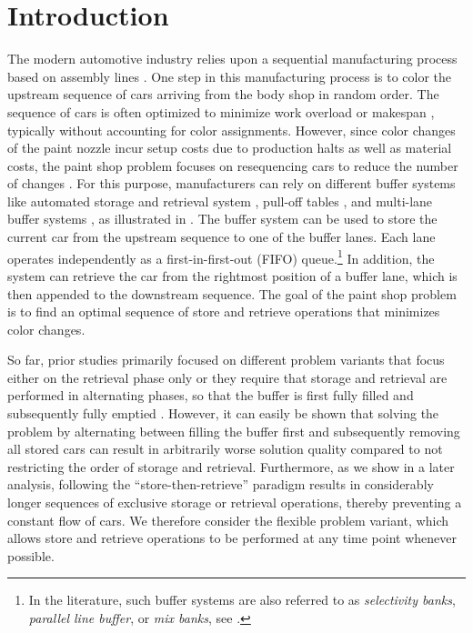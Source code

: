 \documentclass[11pt]{elsarticle}
\begin{document}
\vspace{-0.4cm}

\section{Introduction}

The modern automotive industry relies upon a sequential manufacturing process based on assembly lines \citep{Boysen.2022}. One step in this manufacturing process is to color the upstream sequence of cars arriving from the body shop in random order. The sequence of cars is often optimized to minimize work overload or makespan \citep[e.g.,][]{Brammer.2022a,Mosadegh.2020,Neufeld.2023}, typically without accounting for color assignments. However, since color changes of the paint nozzle incur setup costs due to production halts as well as material costs, the paint shop problem focuses on resequencing cars to reduce the number of changes \citep[e.g.,][]{Bysko.2020}. For this purpose, manufacturers can rely on different buffer systems like automated storage and retrieval system \citep[AS/RS, e.g.,][]{Gunay.2017,inman2003algorithm}, pull-off tables \citep[e.g.,][]{Boysen.2011, lahmar2003resequencing}, and multi-lane buffer systems \citep[e.g.,][]{Epping.2003,taube2018resequencing}, as illustrated in . The buffer system can be used to store the current car from the upstream sequence to one of the buffer lanes. Each lane operates independently as a first-in-first-out (FIFO) queue.\footnote{In the literature, such buffer systems are also referred to as \emph{selectivity banks}, \emph{parallel line buffer}, or \emph{mix banks}, see \citet{boysen_resequencing_2012}.} In addition, the system can retrieve the car from the rightmost position of a buffer lane, which is then appended to the downstream sequence. The goal of the paint shop problem is to find an optimal sequence of store and retrieve operations that minimizes color changes.



So far, prior studies primarily focused on different problem variants that focus either on the retrieval phase only \citep[e.g.,][]{Epping.2003,hong2018accelerated,spieckermann_sequential_2004} or they require that storage and retrieval are performed in alternating phases, so that the buffer is first fully filled and subsequently fully emptied \citep[e.g.,][]{Ding.2004,wu2021mathematical}. However, it can easily be shown that solving the problem by alternating between filling the buffer first and subsequently removing all stored cars can result in arbitrarily worse solution quality compared to not restricting the order of storage and retrieval. Furthermore, as we show in a later analysis, following the ``store-then-retrieve'' paradigm results in considerably longer sequences of exclusive storage or retrieval operations, thereby preventing a constant flow of cars. We therefore consider the flexible problem variant, which allows store and retrieve operations to be performed at any time point whenever possible. 
\end{document}

